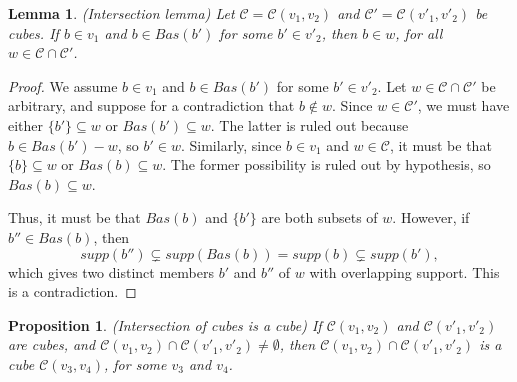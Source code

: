\documentclass{amsart}
\newtheorem{lemma}[theorem]{Lemma}
\newtheorem{proposition}[theorem]{Proposition}
\newtheorem{standing assumption}[theorem]{Standing Assumption}
\begin{document}
\begin{lemma} (Intersection lemma) \label{lemma:intersection}
Let $\mathcal{C} = \mathcal{C}(v_{1},v_{2})$ and
$\mathcal{C}' = \mathcal{C}(v'_{1},v'_{2})$ be cubes.
If $b \in v_{1}$ and $b \in Bas(b')$ for some $b' \in v'_{2}$, 
then $b \in w$, for all $w \in \mathcal{C} \cap \mathcal{C}'$.
\end{lemma}

\begin{proof}
We assume $b \in v_{1}$ and $b \in Bas(b')$ for some $b' \in v'_{2}$. 
Let $w \in \mathcal{C} \cap \mathcal{C}'$ be arbitrary, and suppose for a contradiction that $b \not \in w$. Since $w \in \mathcal{C}'$, we must have 
either $\{ b' \} \subseteq w$ or $Bas(b') \subseteq w$. The latter is ruled out
because $b \in Bas(b') - w$, so $b' \in w$. Similarly, since $b \in v_{1}$ and $w \in \mathcal{C}$, it must be that $\{ b \} \subseteq w$ or $Bas(b) \subseteq w$. The former possibility is ruled out by hypothesis, so 
$Bas(b) \subseteq w$. 

Thus, it must be that $Bas(b)$ and $\{ b' \}$ are both subsets of $w$. However, if $b'' \in Bas(b)$, then 
\[ supp(b'') \subsetneq supp(Bas(b)) = supp(b)  \subsetneq supp(b'), \]
which gives two distinct members $b'$ and $b''$ of $w$ with overlapping support. This is a contradiction.
\end{proof}

\begin{proposition}
(Intersection of cubes is a cube)
If $\mathcal{C}(v_{1},v_{2})$ and $\mathcal{C}(v'_{1},v'_{2})$ are cubes,
and $\mathcal{C}(v_{1},v_{2}) \cap \mathcal{C}(v'_{1},v'_{2}) \neq \emptyset$, then
$\mathcal{C}(v_{1},v_{2}) \cap \mathcal{C}(v'_{1},v'_{2})$ is a cube $\mathcal{C}(v_{3},v_{4})$,
for some $v_{3}$ and $v_{4}$.
\end{proposition}
\end{document}
